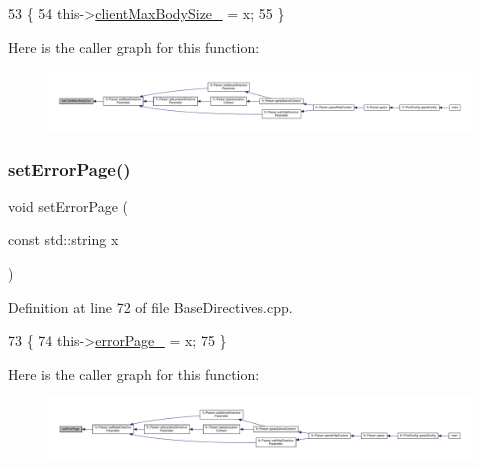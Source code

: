 \begin{DoxyCode}
53     \{
54         this->\hyperlink{classft_1_1_base_directives_ad65c2594d2a90ca065d410dfd4066a19}{clientMaxBodySize\_} = x;
55     \}
\end{DoxyCode}
Here is the caller graph for this function\+:
\nopagebreak
\begin{figure}[H]
\begin{center}
\leavevmode
\includegraphics[width=350pt]{classft_1_1_base_directives_a39bf4922f3236043c76beaffaa557a3b_icgraph}
\end{center}
\end{figure}
\mbox{\label{classft_1_1_base_directives_a505ecc88b3e1779583ad60cc243c7769}} 
\subsubsection{\texorpdfstring{set\+Error\+Page()}{setErrorPage()}}
{\footnotesize\ttfamily void set\+Error\+Page (\begin{DoxyParamCaption}\item[{const std\+::string}]{x }\end{DoxyParamCaption})\hspace{0.3cm}{\ttfamily [inherited]}}



Definition at line 72 of file Base\+Directives.\+cpp.


\begin{DoxyCode}
73     \{
74         this->\hyperlink{classft_1_1_base_directives_a5c0d388109f086503961de84fe3fce90}{errorPage\_} = x;
75     \}
\end{DoxyCode}
Here is the caller graph for this function\+:
\nopagebreak
\begin{figure}[H]
\begin{center}
\leavevmode
\includegraphics[width=350pt]{classft_1_1_base_directives_a505ecc88b3e1779583ad60cc243c7769_icgraph}
\end{center}
\end{figure}
\mbox{\label{classft_1_1_base_directives_a6d3d8fd6eaaf71304128af6b3cee2a69}} 
